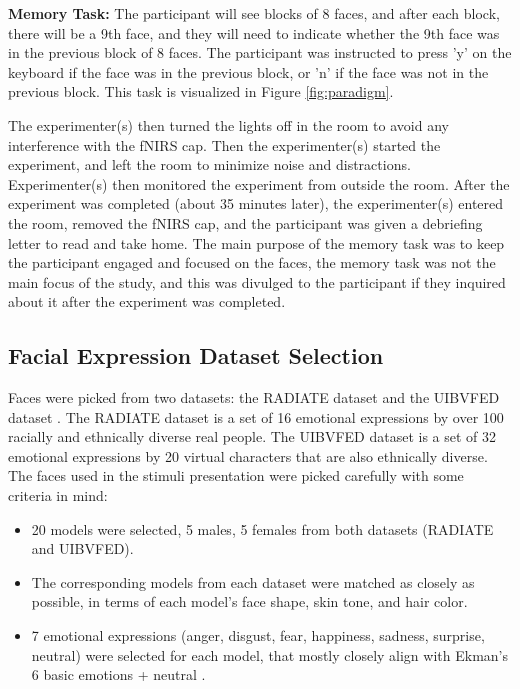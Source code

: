 \textbf{Memory Task:}
The participant will see blocks of 8 faces, and after each block, there will be a 9th face, and they will need to indicate whether the 9th face was in the previous block of 8 faces.
The participant was instructed to press 'y' on the keyboard if the face was in the previous block, or 'n' if the face was not in the previous block.
This task is visualized in Figure \ref{fig:paradigm}. 

The experimenter(s) then turned the lights off in the room to avoid any interference with the fNIRS cap. 
Then the experimenter(s) started the experiment, and left the room to minimize noise and distractions.
Experimenter(s) then monitored the experiment from outside the room. 
After the experiment was completed (about 35 minutes later), the experimenter(s) entered the room, removed the fNIRS cap, and the participant was given a debriefing letter to read and take home. 
The main purpose of the memory task was to keep the participant engaged and focused on the faces, the memory task was not the main focus of the study, and this was divulged to the participant if they inquired about it after the experiment was completed.

\subsection{Facial Expression Dataset Selection}
Faces were picked from two datasets: the RADIATE dataset \citep{conley_racially_2018} and the UIBVFED dataset \citep{oliver_uibvfed_2020}. 
The RADIATE dataset is a set of 16 emotional expressions by over 100 racially and ethnically diverse real people. 
The UIBVFED dataset is a set of 32 emotional expressions by 20 virtual characters that are also ethnically diverse. 
The faces used in the stimuli presentation were picked carefully with some criteria in mind:
\begin{itemize}
    \item 20 models were selected, 5 males, 5 females from both datasets (RADIATE and UIBVFED). 
    \item The corresponding models from each dataset were matched as closely as possible, in terms of each model's face shape, skin tone, and hair color. 
    \item 7 emotional expressions (anger, disgust, fear, happiness, sadness, surprise, neutral) were selected for each model, that mostly closely align with Ekman's 6 basic emotions + neutral \citep{ekman_are_1992}.
\end{itemize}

